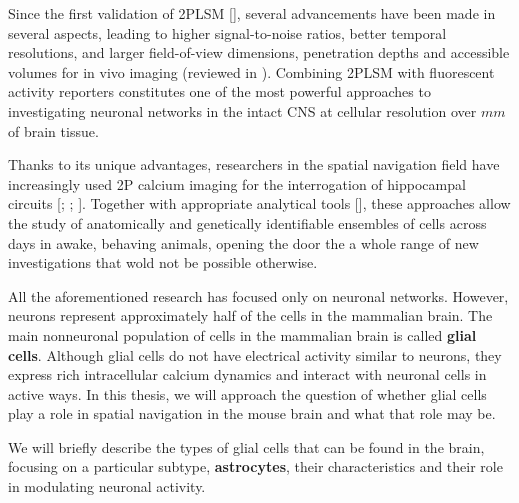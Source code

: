 Since the first validation of 2PLSM [\cite{denk1990}], several advancements have been made in several aspects, leading to higher signal-to-noise ratios, better temporal resolutions, and larger field-of-view dimensions, penetration depths and accessible volumes for in vivo imaging (reviewed in \cite{yang2017}). 
Combining 2PLSM with fluorescent activity reporters constitutes one of the most powerful approaches to investigating neuronal networks in the intact CNS at cellular resolution over $mm$ of brain tissue.
 
Thanks to its unique advantages, researchers in the spatial navigation field have increasingly used 2P calcium imaging for the interrogation of hippocampal circuits [\cite{gauthier2018}; \cite{rubin2015}; \cite{dombeck2010}].
Together with appropriate analytical tools [\cite{sheintuch2017}], these approaches allow the study of anatomically and genetically identifiable ensembles of cells across days in awake, behaving animals, opening the door the a whole range of new investigations that wold not be possible otherwise. 

All the aforementioned research has focused only on neuronal networks. 
However, neurons represent approximately half of the cells in the mammalian brain. 
The main nonneuronal population of cells in the mammalian brain is called \textbf{glial cells}.
Although glial cells do not have electrical activity similar to neurons, they express rich intracellular calcium dynamics and interact with neuronal cells in active ways. 
In this thesis, we will approach the question of whether glial cells play a role in spatial navigation in the mouse brain and what that role may be. 

We will briefly describe the types of glial cells that can be found in the brain, focusing on a particular subtype, \textbf{astrocytes}, their characteristics and their role in modulating neuronal activity. 
